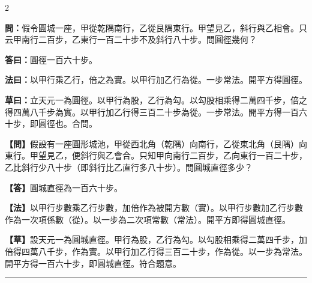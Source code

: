 \documentclass[11pt,a4paper]{article}
\newcommand{\longline}{\noindent\rule{\textwidth}{0.4pt}}
\newcommand{\wenC}[1]{\par\noindent\textbf{\textcolor{probcolor}{問：}}{#1}\par}
\newcommand{\daC}[1]{\par\noindent\textbf{\textcolor{anscolor}{答曰：}}{#1}\par}
\newcommand{\fayueC}[1]{\par\noindent\textbf{\textcolor{methodcolor}{法曰：}}{#1}\par}
\newcommand{\caoyueC}[1]{\par\noindent\textbf{草曰：}{#1}\par}
\newcommand{\wenM}[1]{\par\noindent\textbf{\textcolor{probcolor}{【問】}}{#1}\par}
\newcommand{\daM}[1]{\par\noindent\textbf{\textcolor{anscolor}{【答】}}{#1}\par}
\newcommand{\fayueM}[1]{\par\noindent\textbf{\textcolor{methodcolor}{【法】}}{#1}\par}
\newcommand{\caoyueM}[1]{\par\noindent\textbf{【草】}{#1}\par}
\begin{document}
\begin{paracol}{2}

\wenC{假令圓城一座，甲從乾隅南行，乙從艮隅東行。甲望見乙，斜行與乙相會。只云甲南行二百步，乙東行一百二十步不及斜行八十步。問圓徑幾何？}

\daC{圓徑一百六十步。}

\fayueC{以甲行乘乙行，倍之為實。以甲行加乙行為從。一步常法。開平方得圓徑。}

\caoyueC{立天元一為圓徑。以甲行為股，乙行為勾。以勾股相乘得二萬四千步，倍之得四萬八千步為實。以甲行加乙行得三百二十步為從。一步常法。開平方得一百六十步，即圓徑也。合問。}

\switchcolumn

\wenM{假設有一座圓形城池，甲從西北角（乾隅）向南行，乙從東北角（艮隅）向東行。甲望見乙，便斜行與乙會合。只知甲向南行二百步，乙向東行一百二十步，乙比斜行少八十步（即斜行比乙直行多八十步）。問圓城直徑多少？}

\daM{圓城直徑為一百六十步。}

\fayueM{以甲行步數乘乙行步數，加倍作為被開方數（實）。以甲行步數加乙行步數作為一次項係數（從）。以一步為二次項常數（常法）。開平方即得圓城直徑。}

\caoyueM{設天元一為圓城直徑。甲行為股，乙行為勾。以勾股相乘得二萬四千步，加倍得四萬八千步，作為實。以甲行加乙行得三百二十步，作為從。以一步為常法。開平方得一百六十步，即圓城直徑。符合題意。}

\end{paracol}

\vspace{0.3cm}
\longline
\end{document}
